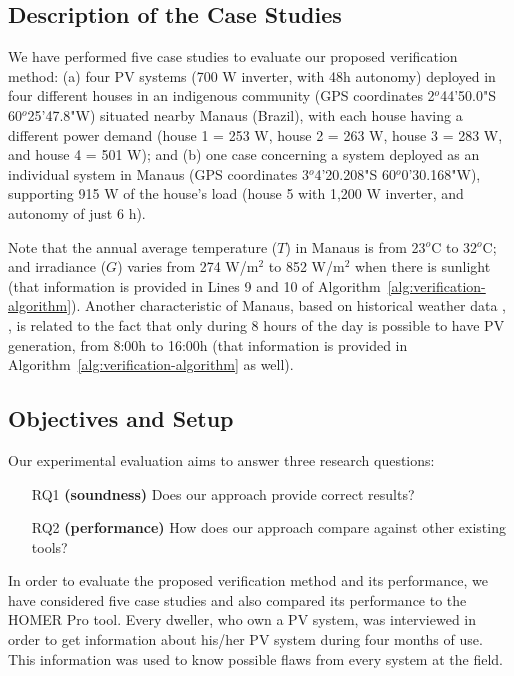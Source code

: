 \documentclass[journal]{IEEEtran}
\begin{document}
\subsection{Description of the Case Studies}

We have performed five case studies to evaluate our proposed verification method: (a) four PV systems (700 W inverter, with 48h autonomy) deployed in four different houses in an indigenous community (GPS coordinates 2$^{o}$44'50.0"S 60$^{o}$25'47.8"W) situated nearby Manaus (Brazil), with each house having a different power demand (house 1 = 253 W, house 2 = 263 W, house 3 = 283 W, and house 4 = 501 W); and (b) one case concerning a system deployed as an individual system in Manaus (GPS coordinates 3$^{o}$4'20.208"S 60$^{o}$0'30.168"W), supporting 915 W of the house's load (house 5 with 1,200 W inverter, and autonomy of just 6 h). 

Note that the annual average temperature ($T$) in Manaus is from 23$^{o}$C to 32$^{o}$C; and irradiance ($G$) varies from 274 W/m$^{2}$ to 852 W/m$^{2}$ when there is sunlight (that information is provided in Lines 9 and 10 of Algorithm~\ref{alg:verification-algorithm}). Another characteristic of Manaus, based on historical weather data \cite{Temperature}, \cite{Irradiance}, is related to the fact that only during 8 hours of the day is possible to have PV generation, from 8:00h to 16:00h (that information is provided in Algorithm~\ref{alg:verification-algorithm} as well).


\subsection{Objectives and Setup}

Our experimental evaluation aims to answer three research questions:
%
\begin{enumerate}
\item[RQ1] \textbf{(soundness)} Does our approach provide correct results?
\item[RQ2] \textbf{(performance)} How does our approach compare against other existing tools?
\end{enumerate}

In order to evaluate the proposed verification method and its performance, we have considered five case studies and also compared its performance to the HOMER Pro tool. Every dweller, who own a PV system, was interviewed in order to get information about his/her PV system during four months of use. This information was used to know possible flaws from every system at the field.
\end{document}

